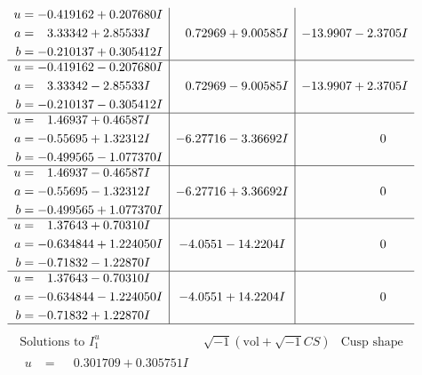 \documentclass[1p]{elsarticle_modified}
\theoremstyle{definition}
\newcommand{\I}{\sqrt{-1}}
\begin{document}
$$\begin{array}{c|c|c}
\begin{aligned}
u &= -0.419162 + 0.207680 I \\
a &= \phantom{-}3.33342 + 2.85533 I \\
b &= -0.210137 + 0.305412 I\end{aligned}
 & \phantom{-}0.72969 + 9.00585 I & -13.9907 - 2.3705 I \\ \hline\begin{aligned}
u &= -0.419162 - 0.207680 I \\
a &= \phantom{-}3.33342 - 2.85533 I \\
b &= -0.210137 - 0.305412 I\end{aligned}
 & \phantom{-}0.72969 - 9.00585 I & -13.9907 + 2.3705 I \\ \hline\begin{aligned}
u &= \phantom{-}1.46937 + 0.46587 I \\
a &= -0.55695 + 1.32312 I \\
b &= -0.499565 - 1.077370 I\end{aligned}
 & -6.27716 - 3.36692 I & \phantom{-0.000000 } 0 \\ \hline\begin{aligned}
u &= \phantom{-}1.46937 - 0.46587 I \\
a &= -0.55695 - 1.32312 I \\
b &= -0.499565 + 1.077370 I\end{aligned}
 & -6.27716 + 3.36692 I & \phantom{-0.000000 } 0 \\ \hline\begin{aligned}
u &= \phantom{-}1.37643 + 0.70310 I \\
a &= -0.634844 + 1.224050 I \\
b &= -0.71832 - 1.22870 I\end{aligned}
 & -4.0551 - 14.2204 I & \phantom{-0.000000 } 0 \\ \hline\begin{aligned}
u &= \phantom{-}1.37643 - 0.70310 I \\
a &= -0.634844 - 1.224050 I \\
b &= -0.71832 + 1.22870 I\end{aligned}
 & -4.0551 + 14.2204 I & \phantom{-0.000000 } 0\\
 \hline 
 \end{array}$$\newpage$$\begin{array}{c|c|c}  
\text{Solutions to }I^u_{1}& \I (\text{vol} + \sqrt{-1}CS) & \text{Cusp shape}\\
 \hline 
\begin{aligned}
u &= \phantom{-}0.301709 + 0.305751 I \\

\end{aligned}
\end{array}$$
\end{document}
